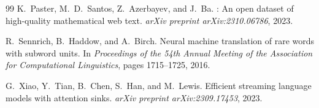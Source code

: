 \documentclass[10pt,a4paper]{article}
\begin{document}
\begin{thebibliography}{99}
K.~Paster, M.~D.~Santos, Z.~Azerbayev, and J.~Ba.
: An open dataset of high-quality mathematical web text.
\newblock \textit{arXiv preprint arXiv:2310.06786}, 2023.

R.~Sennrich, B.~Haddow, and A.~Birch.
\newblock Neural machine translation of rare words with subword units.
\newblock In \textit{Proceedings of the 54th Annual Meeting of the Association for Computational Linguistics}, pages 1715--1725, 2016.

G.~Xiao, Y.~Tian, B.~Chen, S.~Han, and M.~Lewis.
\newblock Efficient streaming language models with attention sinks.
\newblock \textit{arXiv preprint arXiv:2309.17453}, 2023.

\end{thebibliography}
\end{document}

